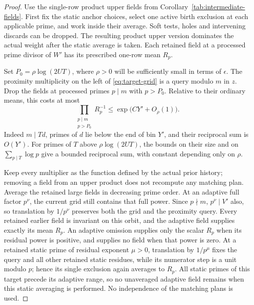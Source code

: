 \begin{proof}
Use the single-row product upper fields from
Corollary~\ref{tab:intermediate-fields}.  First fix the static anchor choices, select
one active birth exclusion at each applicable prime, and work inside
their average.  Soft tests, holes and intervening discards can be
dropped.  The resulting product upper version dominates the actual
weight after the static average is taken.  Each retained field at a
processed prime divisor of $W'$ has its prescribed one-row mean $R_p$.

Set $P_0=\rho\log(2UT)$, where $\rho>0$ will be sufficiently small in
terms of $\epsilon$.  The proximity multiplicity on the left of
\eqref{eq:target-grid} is a query modulo $m$ in $z$.  Drop the fields
at processed primes $p\mid m$ with $p>P_0$.  Relative to their ordinary
means, this costs at most
\[
 \prod_{\substack{p\mid m\\p>P_0}}R_p^{-1}
 \le \exp\bigl(CY'+O_\rho(1)\bigr).
\]
Indeed $m\mid Td$, primes of $d$ lie below the end of bin $Y'$, and
their reciprocal sum is $O(Y')$.  For primes of $T$ above
$\rho\log(2UT)$, the bounds on their size and on
$\sum_{p\mid T}\log p$ give a bounded reciprocal sum, with constant
depending only on $\rho$.

Keep every multiplier as the function defined by the actual prior
history; removing a field from an upper product does not recompute
any matching plan.  Average the retained large fields in decreasing
prime order.  At an adaptive full factor $p^\nu$, the current grid
still contains that full power.  Since $p\nmid m$, $p^\nu\mid V'$
also, so translation by $1/p^\nu$ preserves both the grid and the
proximity query.  Every retained earlier field is invariant on this
orbit, and the adaptive field supplies exactly its mean $R_p$.
An adaptive omission supplies only the scalar $R_p$ when its residual
power is positive, and supplies no field when that power is zero.
At a retained static prime of residual exponent $\mu>0$, translation
by $1/p^\mu$ fixes the query and all other retained static residues,
while its numerator step is a unit modulo $p$; hence its single
exclusion again averages to $R_p$.  All static primes of this target
precede its adaptive range, so no unaveraged adaptive field remains
when this static averaging is performed.  No independence of the
matching plans is used.


\end{proof}
